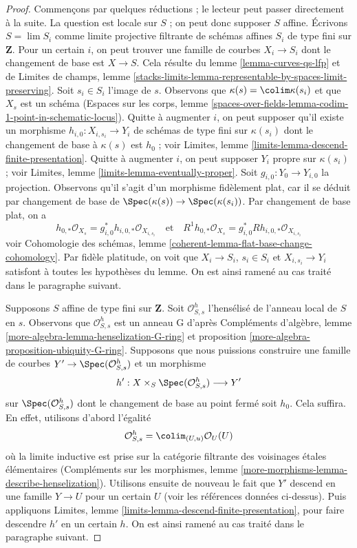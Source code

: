 \begin{proof}
Commençons par quelques réductions ; le lecteur peut passer directement à la suite.
La question est locale sur $S$ ; on peut donc supposer $S$ affine.
Écrivons $S = \lim S_i$ comme limite projective filtrante de schémas affines $S_i$
de type fini sur $\mathbf{Z}$.
Pour un certain $i$, on peut trouver une famille de courbes $X_i \to S_i$
dont le changement de base est $X \to S$. Cela résulte du
lemme \ref{lemma-curves-qs-lfp} et de
Limites de champs, lemme
\ref{stacks-limits-lemma-representable-by-spaces-limit-preserving}.
Soit $s_i \in S_i$ l'image de $s$. Observons que
$\kappa(s) = \colim \kappa(s_i)$ et que $X_s$ est un schéma
(Espaces sur les corps, lemme
\ref{spaces-over-fields-lemma-codim-1-point-in-schematic-locus}).
Quitte à augmenter $i$, on peut supposer qu'il existe un morphisme
$h_{i, 0} : X_{i, s_i} \to Y_i$
de schémas de type fini sur $\kappa(s_i)$ dont le changement de base à
$\kappa(s)$ est $h_0$ ; voir
Limites, lemme \ref{limits-lemma-descend-finite-presentation}.
Quitte à augmenter $i$, on peut supposer $Y_i$ propre sur $\kappa(s_i)$ ; voir
Limites, lemme \ref{limits-lemma-eventually-proper}.
Soit $g_{i, 0} : Y_0 \to Y_{i, 0}$ la projection. Observons qu'il
s'agit d'un morphisme fidèlement plat, car il se déduit par changement de base de
$\Spec(\kappa(s)) \to \Spec(\kappa(s_i))$.
Par changement de base plat, on a
$$
h_{0, *}\mathcal{O}_{X_s} = g_{i, 0}^*h_{i, 0, *}\mathcal{O}_{X_{i, s_i}}
\quad\text{et}\quad
R^1h_{0, *}\mathcal{O}_{X_s} = g_{i, 0}^*Rh_{i, 0, *}\mathcal{O}_{X_{i, s_i}}
$$
voir Cohomologie des schémas, lemme
\ref{coherent-lemma-flat-base-change-cohomology}.
Par fidèle platitude, on voit que $X_i \to S_i$, $s_i \in S_i$ et
$X_{i, s_i} \to Y_i$ satisfont à toutes les hypothèses du lemme.
On est ainsi ramené au cas traité dans le paragraphe suivant.

\medskip\noindent
Supposons $S$ affine de type fini sur $\mathbf{Z}$.
Soit $\mathcal{O}_{S, s}^h$ l'hensélisé de l'anneau local
de $S$ en $s$. Observons que $\mathcal{O}_{S, s}^h$ est un anneau G d'après
Compléments d'algèbre, lemme \ref{more-algebra-lemma-henselization-G-ring} et
proposition \ref{more-algebra-proposition-ubiquity-G-ring}.
Supposons que nous puissions construire une famille de courbes
$Y' \to \Spec(\mathcal{O}_{S, s}^h)$ et un morphisme
$$
h' : X \times_S \Spec(\mathcal{O}_{S, s}^h) \longrightarrow Y'
$$
sur $\Spec(\mathcal{O}_{S, s}^h)$ dont le changement de base au point
fermé soit $h_0$. Cela suffira. En effet, utilisons d'abord l'égalité
$$
\mathcal{O}_{S, s}^h = \colim_{(U, u)} \mathcal{O}_U(U)
$$
où la limite inductive est prise sur la catégorie filtrante des
voisinages étales élémentaires (Compléments sur les morphismes, lemme
\ref{more-morphisms-lemma-describe-henselization}).
Utilisons ensuite de nouveau le fait que $Y'$ descend en une famille
$Y \to U$ pour un certain $U$ (voir les références données ci-dessus).
Puis appliquons
Limites, lemme \ref{limits-lemma-descend-finite-presentation},
pour faire descendre $h'$ en un certain $h$. On est ainsi ramené au cas
traité dans le paragraphe suivant.


\end{proof}
